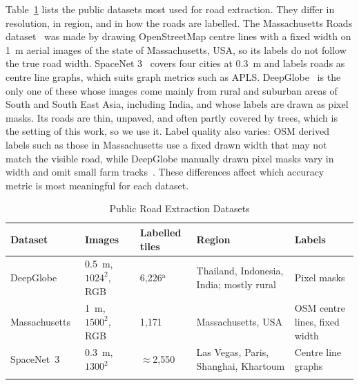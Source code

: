 \documentclass{ieeeaccess}
\begin{document}
Table~\ref{tab:datasets} lists the public datasets most used for road extraction. They differ in resolution, in region, and in how the roads are labelled. The Massachusetts Roads dataset~\cite{mnih2013thesis} was made by drawing OpenStreetMap centre lines with a fixed width on 1~m aerial images of the state of Massachusetts, USA, so its labels do not follow the true road width. SpaceNet 3~\cite{vanetten2018spacenet} covers four cities at 0.3~m and labels roads as centre line graphs, which suits graph metrics such as APLS. DeepGlobe~\cite{demir2018deepglobe} is the only one of these whose images come mainly from rural and suburban areas of South and South East Asia, including India, and whose labels are drawn as pixel masks. Its roads are thin, unpaved, and often partly covered by trees, which is the setting of this work, so we use it. Label quality also varies: OSM derived labels such as those in Massachusetts use a fixed drawn width that may not match the visible road, while DeepGlobe manually drawn pixel masks vary in width and omit small farm tracks~\cite{demir2018deepglobe}. These differences affect which accuracy metric is most meaningful for each dataset.

\begin{table}[t]
\caption{Public Road Extraction Datasets}
\label{tab:datasets}
\setlength{\tabcolsep}{2pt}
\renewcommand{\arraystretch}{1.2}
{\small\tablebodyfont
\begin{tabular}{|>{{\raggedright\arraybackslash}}p{68pt}|>{{\raggedright\arraybackslash}}p{46pt}|>{{\raggedright\arraybackslash}}p{28pt}|>{{\raggedright\arraybackslash}}p{54pt}|>{{\raggedright\arraybackslash}}p{34pt}|}
\hline
Dataset & Images & Labelled tiles & Region & Labels \\
\hline
DeepGlobe~\cite{demir2018deepglobe} & 0.5~m, $1024^2$, RGB & 6,226$^{\mathrm{a}}$ & Thailand, Indonesia, India; mostly rural & Pixel masks \\
Massachusetts~\cite{mnih2013thesis} & 1~m, $1500^2$, RGB & 1,171 & Massachusetts, USA & OSM centre lines, fixed width \\
SpaceNet~3~\cite{vanetten2018spacenet} & 0.3~m, $1300^2$ & $\approx$2,550 & Las Vegas, Paris, Shanghai, Khartoum & Centre line graphs \\
\hline
\multicolumn{5}{p{238pt}}{$^{\mathrm{a}}$Of 8,570 tiles in total; only the training part of the challenge has public labels.}
\end{tabular}}
\renewcommand{\arraystretch}{1}
\end{table}
\end{document}
